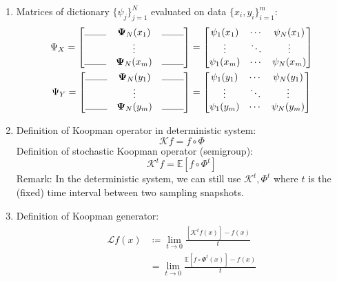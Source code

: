 \documentclass{article}[11]
\begin{document}
\begin{enumerate}
	\item Matrices of dictionary $\{\psi_j\}_{j=1}^N$ evaluated on data $\{x_i, y_i\}_{i=1}^m$:
	\begin{gather*}
		\Psi_X = \begin{bmatrix}
			\rule{0.8cm}{0.1mm} & \mathbf{\Psi}_N(x_1) & \rule{0.8cm}{0.1mm} \\
			& \vdots &   \\
			\rule{0.8cm}{0.1mm} & \mathbf{\Psi}_N(x_m) & \rule{0.8cm}{0.1mm}
		\end{bmatrix}
		=\begin{bmatrix}
			\psi_1(x_1) & \cdots & \psi_{N}(x_1) \\
			\vdots & \ddots & \vdots \\
			\psi_1(x_m) & \cdots & \psi_{N}(x_m)
		\end{bmatrix} \\
		\Psi_Y = \begin{bmatrix}
			\rule{0.8cm}{0.1mm} & \mathbf{\Psi}_N(y_1) & \rule{0.8cm}{0.1mm} \\
			& \vdots &   \\
			\rule{0.8cm}{0.1mm} & \mathbf{\Psi}_N(y_m) & \rule{0.8cm}{0.1mm}
		\end{bmatrix}
		= \begin{bmatrix}
			\psi_1(y_1) & \cdots & \psi_{N}(y_1) \\
			\vdots & \ddots & \vdots \\
			\psi_1(y_m) & \cdots & \psi_{N}(y_m)
		\end{bmatrix}
	\end{gather*}
		
	\item Definition of Koopman operator in deterministic system:
	$$\mathcal{K}f = f\circ\Phi$$
	Definition of stochastic Koopman operator (semigroup):
	$$\mathcal{K}^{t}f = \mathbb{E}[f\circ\Phi^{t}]$$
	Remark: In the deterministic system, we can still use $\mathcal{K}^t,\Phi^t$ where $t$ is the (fixed) time interval between two sampling snapshots.
	\item Definition of Koopman generator:
	\begin{gather}\label{def_generator}
		\begin{aligned}
			\mathcal{L}f(x) &\coloneqq \lim_{t \to 0} \frac{[\mathcal{K}^{t}f(x)] - f(x)}{t} \\
			&= \lim_{t \to 0} \frac{\mathbb{E}[f\circ\Phi^{t}(x)] - f(x)}{t}
		\end{aligned}
	\end{gather}
	
\end{enumerate}
\end{document}
